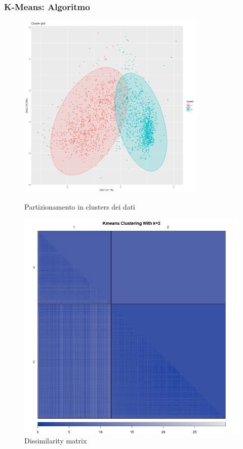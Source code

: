 \begin{frame}[fragile]
\frametitle{K-Means: Algoritmo}
\begin{figure}[H]
   \begin{minipage}{0.48\textwidth}
     \centering
         \includegraphics[width=0.8\textwidth]{Img/KMEANS005.png}
    \caption{Partizionamento in clusters dei dati}
    \label{fig:clusters}
   \end{minipage}\hfill
   \begin{minipage}{0.48\textwidth}
     \centering
     \includegraphics[width=0.8\linewidth]{Img/KMEANS006.png}
     \caption{Dissimilarity matrix}\label{fig:dissimilaritymatrix}
   \end{minipage}
\end{figure}
\end{frame}
